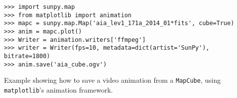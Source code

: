 \begin{listing}[H]
\begin{verbatim}
>>> import sunpy.map
>>> from matplotlib import animation
>>> mapc = sunpy.map.Map('aia_lev1_171a_2014_01*fits', cube=True)
>>> anim = mapc.plot()
>>> Writer = animation.writers['ffmpeg']
>>> writer = Writer(fps=10, metadata=dict(artist='SunPy'), bitrate=1800)
>>> anim.save('aia_cube.ogv')
\end{verbatim}
\caption{Example showing how to save a video animation from a \texttt{MapCube}, using 
\texttt{matplotlib}'s animation framework.}
\label{code:mapcube_2}
\end{listing}
